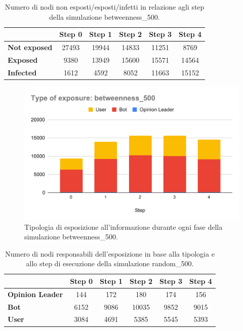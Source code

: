             
            \begin{table}[H]
                \centering
                \begin{tabular}{l|c|c|c|c|c}
                            & Step 0 & Step 1 & Step 2 & Step 3 & Step 4 \\ \hline
                \textbf{Not exposed} & 27493  & 19944  & 14833  & 11251  & 8769   \\ \hline
                \textbf{Exposed}     & 9380   & 13949  & 15600  & 15571  & 14564  \\ \hline
                \textbf{Infected}    & 1612   & 4592   & 8052   & 11663  & 15152  \\
                \end{tabular}
                \caption{Numero di nodi non esposti/esposti/infetti in relazione agli step della simulazione betweenness\_500.}
            \end{table}
            
            \begin{figure}[H]
                \centering
                \includegraphics[width=.7\textwidth]{resources/charts/Type of exposure_ betweenness_500.pdf}
                \caption{Tipologia di esposizione all'informazione durante ogni fase della simulazione betweenness\_500.}
            \end{figure}
            
            \begin{table}[H]
                \centering
                \begin{tabular}{l|c|c|c|c|c}
                               & Step 0 & Step 1 & Step 2 & Step 3 & Step 4 \\ \hline
                \textbf{Opinion Leader} & 144    & 172    & 180    & 174    & 156    \\ \hline
                \textbf{Bot}            & 6152   & 9086   & 10035  & 9852   & 9015   \\ \hline
                \textbf{User}           & 3084   & 4691   & 5385   & 5545   & 5393   \\
                \end{tabular}
                \caption{Numero di nodi responsabili dell'esposizione in base alla tipologia e allo step di esecuzione della simulazione random\_500.}
            \end{table}

